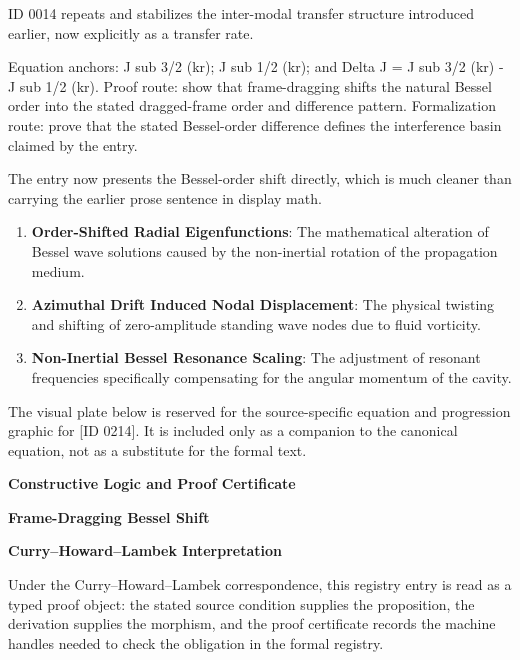 ID 0014 repeats and stabilizes the inter-modal transfer structure introduced earlier, now explicitly as a transfer rate.

Equation anchors: J sub 3/2 (kr); J sub 1/2 (kr); and Delta J = J sub 3/2 (kr) - J sub 1/2 (kr). Proof route: show that frame-dragging shifts the natural Bessel order into the stated dragged-frame order and difference pattern. Formalization route: prove that the stated Bessel-order difference defines the interference basin claimed by the entry.

The entry now presents the Bessel-order shift directly, which is much cleaner than carrying the earlier prose sentence in display math.
\endgroup

\begin{enumerate}[leftmargin=1.6em,itemsep=6pt,topsep=4pt]
\item \textbf{Order-Shifted Radial Eigenfunctions}: The mathematical alteration of Bessel wave solutions caused by the non-inertial rotation of the propagation medium.
\item \textbf{Azimuthal Drift Induced Nodal Displacement}: The physical twisting and shifting of zero-amplitude standing wave nodes due to fluid vorticity.
\item \textbf{Non-Inertial Bessel Resonance Scaling}: The adjustment of resonant frequencies specifically compensating for the angular momentum of the cavity.
\end{enumerate}

\begingroup\footnotesize\sloppy
The visual plate below is reserved for the source-specific equation and progression graphic for [ID 0214]. It is included only as a companion to the canonical equation, not as a substitute for the formal text.
\par\endgroup
\ifTZPDarkEdition
{}
\fi

\clearpage
\begingroup\tzpsupportsetup
\noindent\textbf{\fontsize{10.8pt}{12.8pt}\selectfont [ID 0214] Constructive Logic and Proof Certificate}\par
\noindent\textbf{\fontsize{10pt}{12pt}\selectfont Frame-Dragging Bessel Shift}\par
\vspace{0.45em}
\begingroup
\footnotesize
\setlength{\parskip}{0.22em}
\setlength{\parindent}{0pt}
\noindent\textbf{Curry--Howard--Lambek Interpretation}\par
Under the Curry--Howard--Lambek correspondence, this registry entry is read as a typed proof
object: the stated source condition supplies the proposition, the derivation supplies the
morphism, and the proof certificate records the machine handles needed to check the obligation
in the formal registry.

